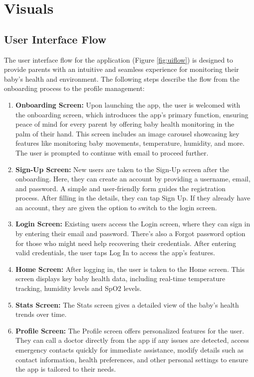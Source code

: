 \documentclass[12pt,a4paper]{report}
\begin{document}
\section{Visuals}
\subsection{User Interface Flow}
The user interface flow for the application (Figure \ref{fig:uiflow}) is designed to provide parents with an intuitive and seamless experience for monitoring their baby's health and environment. The following steps describe the flow from the onboarding process to the profile management:
\begin{enumerate}
  \item \textbf{Onboarding Screen:} Upon launching the app, the user is welcomed with the onboarding screen, which introduces the app’s primary function, ensuring peace of mind for every parent by offering baby health monitoring in the palm of their hand. This screen includes an image carousel showcasing key features like monitoring baby movements, temperature, humidity, and more. The user is prompted to continue with email to proceed further.
  \item \textbf{Sign-Up Screen:} New users are taken to the Sign-Up screen after the onboarding. Here, they can create an account by providing a username, email, and password. A simple and user-friendly form guides the registration process. After filling in the details, they can tap Sign Up. If they already have an account, they are given the option to switch to the login screen.
  \item \textbf{Login Screen:} Existing users access the Login screen, where they can sign in by entering their email and password. There’s also a Forgot password option for those who might need help recovering their credentials. After entering valid credentials, the user taps Log In to access the app’s features.
  \item \textbf{Home Screen:} After logging in, the user is taken to the Home screen. This screen displays key baby health data, including real-time temperature tracking, humidity levels and SpO2 levels.
  \item \textbf{Stats Screen:} The Stats screen gives a detailed view of the baby’s health trends over time. 
  \item \textbf{Profile Screen:} The Profile screen offers personalized features for the user. They can call a doctor directly from the app if any issues are detected, access emergency contacts quickly for immediate assistance, modify details such as contact information, health preferences, and other personal settings to ensure the app is tailored to their needs.
\end{enumerate}
\end{document}
